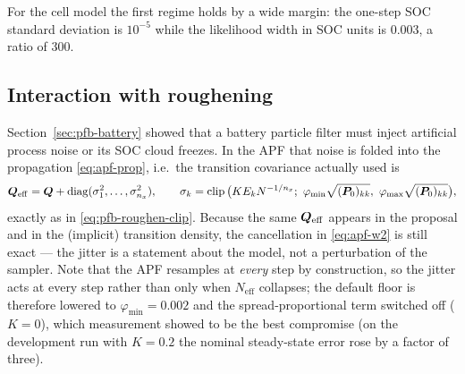 For the cell model the first regime holds by a wide margin: the one-step SOC standard deviation is
$10^{-5}$ while the likelihood width in SOC units is \num{0.003}, a ratio of \num{300}.

\subsection{Interaction with roughening}
Section~\ref{sec:pfb-battery} showed that a battery particle filter must inject artificial process
noise or its SOC cloud freezes.  In the APF that noise is folded into the propagation
\eqref{eq:apf-prop}, i.e.\ the transition covariance actually used is
\begin{equation}
  \mQ_{\mathrm{eff}} = \mQ + \diag(\sigma_1^2,\dots,\sigma_{n_x}^2),
  \qquad
  \sigma_k = \operatorname{clip}\big(K E_k N^{-1/n_x};\ \varphi_{\min}\sqrt{(\mP_0)_{kk}},\ \varphi_{\max}\sqrt{(\mP_0)_{kk}}\big),
  \label{eq:apf-qeff}
\end{equation}
exactly as in \eqref{eq:pfb-roughen-clip}.  Because the same $\bm{Q}_{\mathrm{eff}}$ appears in the
proposal and in the (implicit) transition density, the cancellation in \eqref{eq:apf-w2} is still
exact --- the jitter is a statement about the model, not a perturbation of the sampler.  Note that
the APF resamples at \emph{every} step by construction, so the jitter acts at every step rather
than only when $N_{\mathrm{eff}}$ collapses; the default floor is therefore lowered to
$\varphi_{\min} = 0.002$ and the spread-proportional term switched off ($K=0$), which measurement
showed to be the best compromise (on the development run with $K = 0.2$ the nominal steady-state error rose by a
factor of three).

